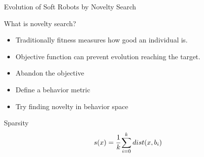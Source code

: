 \documentclass[6pt]{beamer}
\begin{document}
%
%
%
%
%

\begin{frame}{{\scriptsize Evolution of Soft Robots by} Novelty Search~}
\begin{block}{What is novelty search?}
\begin{itemize}
\item Traditionally fitness measures how good an individual is.
\item Objective function can prevent evolution reaching the target.
\item Abandon the objective
\item Define a behavior metric
\item Try finding novelty in behavior space
\end{itemize}
\end{block}
\begin{block}{Sparsity}
\begin{equation*}
s(x) = \cfrac{1}{k} \sum_{i=0}^k dist(x, b_i)
\end{equation*}
\end{block}
\end{frame}
\end{document}
